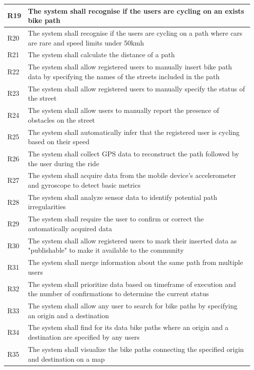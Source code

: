 \begin{longtable}{|l|p{14cm}|}
        R19 & The system shall recognise if the users are cycling on an exists bike path \\ \hline
        R20 & The system shall recognise if the users are cycling on a path where cars are rare and speed limits under 50kmh \\ \hline
        R21 & The system shall calculate the distance of a path \\ \hline
        R22 & The system shall allow registered users to manually insert bike path data by specifying the names of the streets included in the path \\ \hline
        R23 & The system shall allow registered users to manually specify the status of the street \\ \hline
        R24 & The system shall allow users to manually report the presence of obstacles on the street \\ \hline
        R25 & The system shall automatically infer that the registered user is cycling based on their speed \\ \hline
        R26 & The system shall collect GPS data to reconstruct the path followed by the user during the ride \\ \hline
        R27 & The system shall acquire data from the mobile device's accelerometer and gyroscope to detect basic metrics\\ \hline
        R28 & The system shall analyze sensor data to identify potential path irregularities \\ \hline
        R29 & The system shall require the user to confirm or correct the automatically acquired data \\ \hline
        R30 & The system shall allow registered users to mark their inserted data as "publishable" to make it available to the community \\ \hline
        R31 & The system shall merge information about the same path from multiple users \\ \hline
        R32 & The system shall prioritize data based on timeframe of execution and the number of confirmations to determine the current status \\ \hline
        R33 & The system shall allow any user to search for bike paths by specifying an origin and a destination \\ \hline
        R34 & The system shall find for its data bike paths where an origin and a destination are specified by any users \\ \hline
        R35 & The system shall visualize the bike paths connecting the specified origin and destination on a map \\ \hline

\end{longtable}
